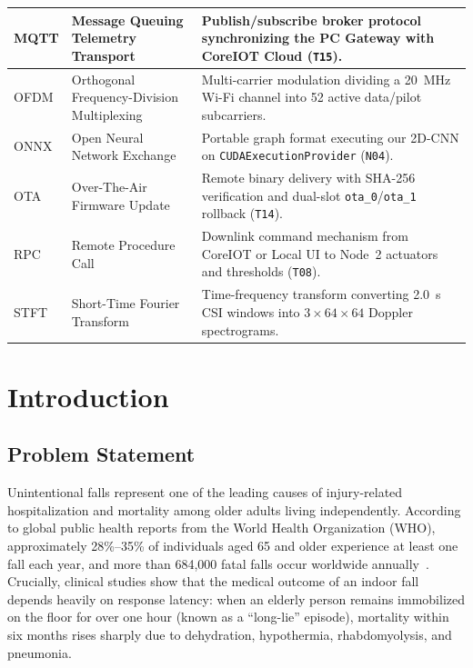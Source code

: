 \documentclass{hcmut-report}
\begin{document}
\begin{table}[H]
\begin{tabularx}{\textwidth}{|P{2.4cm}|P{5.5cm}|Y|}
\hline
MQTT & Message Queuing Telemetry Transport & Publish/subscribe broker protocol synchronizing the PC Gateway with CoreIOT Cloud (\texttt{T15}). \\
\hline
OFDM & Orthogonal Frequency-Division Multiplexing & Multi-carrier modulation dividing a 20~MHz Wi-Fi channel into 52 active data/pilot subcarriers. \\
\hline
ONNX & Open Neural Network Exchange & Portable graph format executing our 2D-CNN on \texttt{CUDAExecutionProvider} (\texttt{N04}). \\
\hline
OTA & Over-The-Air Firmware Update & Remote binary delivery with SHA-256 verification and dual-slot \texttt{ota\_0}/\texttt{ota\_1} rollback (\texttt{T14}). \\
\hline
RPC & Remote Procedure Call & Downlink command mechanism from CoreIOT or Local UI to Node~2 actuators and thresholds (\texttt{T08}). \\
\hline
STFT & Short-Time Fourier Transform & Time-frequency transform converting 2.0~s CSI windows into $3\times 64\times 64$ Doppler spectrograms. \\
\hline
\end{tabularx}
\end{table}

\newpage
\section[Introduction]{Introduction}
\label{sec:intro}

\subsection[Problem Statement]{Problem Statement}
\label{sec:problem}

Unintentional falls represent one of the leading causes of injury-related hospitalization and mortality among older adults living independently. According to global public health reports from the World Health Organization (WHO), approximately 28\%--35\% of individuals aged 65 and older experience at least one fall each year, and more than 684,000 fatal falls occur worldwide annually~\cite{who_falls}. Crucially, clinical studies show that the medical outcome of an indoor fall depends heavily on response latency: when an elderly person remains immobilized on the floor for over one hour (known as a ``long-lie'' episode), mortality within six months rises sharply due to dehydration, hypothermia, rhabdomyolysis, and pneumonia.
\end{document}

